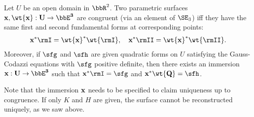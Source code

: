 \begin{thm}
    Let $U$ be an open domain in $\bbR^2$. Two parametric surfaces $\bf{x},\wt{\bf{x}}:U\to \bbE^3$ are congruent (via an element of $\SE_3$) iff they have the same first and second fundamental forms at corresponding points:
    \[\bf{x}^\ast\rmI=\wt{\bf{x}}^\ast \wt{\rmI},\quad \bf{x}^\ast\rmII=\wt{\bf{x}}^\ast \wt{\rmII}.\] 
    Moreover, if $\sfg$ and $\sfh$ are given quadratic forms on $U$ satisfying the Gauss-Codazzi equations with $\sfg$ positive definite, then there exists an immersion $\bf{x}:U\to \bbE^3$ such that $\bf{x}^\ast  \rmI=\sfg$ and $\bf{x}^\ast  \wt{Q}=\sfh$.
\end{thm}
Note that the immersion $\bf{x}$ needs to be specified to claim uniqueness up to congruence. If only $K$ and $H$ are given, the surface cannot be reconstructed uniquely, as we saw above.
